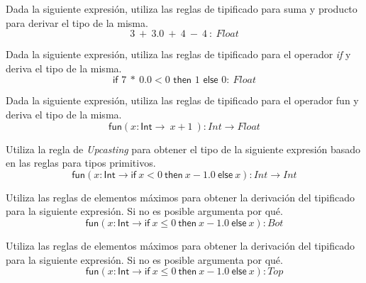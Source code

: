     \bigskip

    \begin{exercise}
        Dada la siguiente expresión, utiliza las reglas de tipificado para suma y producto para derivar el tipo de la misma.
        $$ 3\ +\ 3.0 \ +\ 4\ - \ 4\ : \ \textit{Float}$$
    \end{exercise}
    \bigskip

    \begin{exercise}
        Dada la siguiente expresión, utiliza las reglas de tipificado para el operador \textit{if} y deriva el tipo de la misma.
        $$\textsf{if } 7\ *\ 0.0 < 0 \textsf{ then } 1 \textsf{ else } 0 : \ \textit{Float}$$
    \end{exercise}
    \bigskip


    \begin{exercise}
        Dada la siguiente expresión, utiliza las reglas de tipificado para el operador \textsf{fun} y deriva el tipo de la misma.
        $$ \textsf{fun}(x:\textsf{Int} \rightarrow \ x + 1\ ) : \textit{Int}  \rightarrow \textit{Float} $$
    \end{exercise}

    \bigskip

    \begin{exercise}
        Utiliza la regla de \textit{Upcasting} para obtener el tipo de la siguiente expresión basado en las reglas para tipos primitivos.
        $$ \textsf{fun}(x:\textsf{Int} \rightarrow \textsf{if}\ x < 0\ \textsf{then}\ x - 1.0 \ \textsf{else}\ x ) : \textit{Int}  \rightarrow \textit{Int} $$
    \end{exercise}

    \bigskip

    \begin{exercise}
        Utiliza las reglas de elementos máximos para obtener la derivación del tipificado para la siguiente expresión.
        Si no es posible argumenta por qué.
        $$\textsf{fun}(x:\textsf{Int} \rightarrow \textsf{if}\ x \leq 0\ \textsf{then}\ x - 1.0 \ \textsf{else}\ x   ) : \textit{Bot} $$
    \end{exercise}
	
	\bigskip

    \begin{exercise}
        Utiliza las reglas de elementos máximos para obtener la derivación del tipificado para la siguiente expresión.
	  Si no es posible argumenta por qué.
        $$ \textsf{fun}(x:\textsf{Int} \rightarrow \textsf{if}\ x \leq 0\ \textsf{then}\ x - 1.0 \ \textsf{else}\ x) : \textit{Top} $$
    \end{exercise}
 